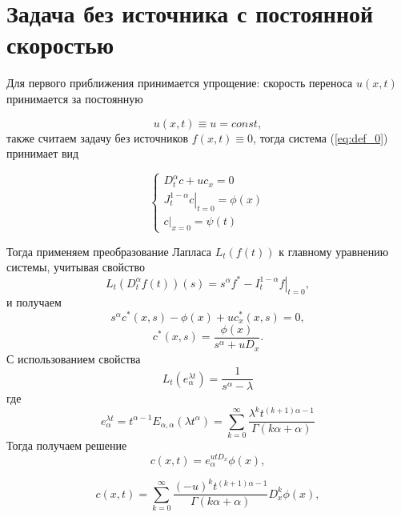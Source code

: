 \section{Задача без источника с постоянной скоростью}

Для первого приближения принимается упрощение: скорость переноса $u(x,t)$ принимается за постоянную

\begin{equation}
	u(x,t) \equiv u = const,
\end{equation}
также считаем задачу без источников $f(x,t)\equiv0$, тогда система (\ref{eq:def_0}) принимает вид

\begin{equation}
	\label{eq:an_0}
	\begin{cases}
		D^\alpha_t c + uc_x = 0\\
		\left.J^{1-\alpha}_tc\right|_{t=0} = \phi(x)\\
		\left.c\right|_{x=0}=\psi(t)
	\end{cases}
\end{equation}

Тогда применяем преобразование Лапласа $L_t(f(t))$ к главному уравнению системы, учитывая свойство
\begin{equation}
	L_t(D^\alpha_tf(t))(s) = s^\alpha f^* - \left. I^{1-\alpha}_tf \right|_{t=0},
\end{equation}
и получаем
\begin{equation}
	s^\alpha c^*(x,s) - \phi(x) + u c^*_x(x,s) = 0,
\end{equation}
\begin{equation}
	c^*(x,s) = \frac{\phi(x)}{s^\alpha + u D_x}.
\end{equation}
С использованием свойства
\begin{equation}
	L_t(e^{\lambda t}_{\alpha}) = \frac{1}{s^\alpha-\lambda}
\end{equation}
где
\begin{equation}
e^{\lambda t}_{\alpha} =
t^{\alpha - 1} E_{\alpha, \alpha}(\lambda t^{\alpha}) =
\sum_{k = 0}^{\infty}\frac{\lambda^k t^{(k+1)\alpha - 1}}{\Gamma(k\alpha + \alpha)}
\end{equation}
Тогда получаем решение
\begin{equation}
	c(x,t) = e^{utD_x}_{\alpha} \phi(x),
\end{equation}

\begin{equation}
	c(x,t) = \sum_{k = 0}^{\infty}\frac{(-u)^k t^{(k+1)\alpha - 1}}{\Gamma(k\alpha + \alpha)} D^k_x \phi(x),
\end{equation}

